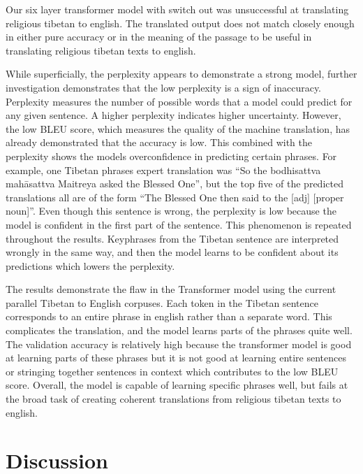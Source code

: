 \documentclass[letterpaper, 12 pt, conference]{ieeeconf}  %
\begin{document}
\par
Our six layer transformer model with switch out was unsuccessful at translating religious tibetan to english. The translated output does not match closely enough in either pure accuracy or in the meaning of the passage to be useful in translating religious tibetan texts to english. \par
While superficially, the perplexity appears to demonstrate a strong model, further investigation demonstrates that the low perplexity is a sign of inaccuracy. Perplexity measures the number of possible words that a model could predict for any given sentence. A higher perplexity indicates higher uncertainty. However, the low BLEU score, which measures the quality of the machine translation, has already demonstrated that the accuracy is low. This combined with the perplexity shows the models overconfidence in predicting certain phrases. For example, one Tibetan phrases expert translation was “So the bodhisattva mahāsattva Maitreya asked the Blessed One”, but the top five of the predicted translations all are of the form “The Blessed One then said to the [adj] [proper noun]”. Even though this sentence is wrong, the perplexity is low because the model is confident in the first part of the sentence. This phenomenon is repeated throughout the results. Keyphrases from the Tibetan sentence are interpreted wrongly in the same way, and then the model learns to be confident about its predictions which lowers the perplexity. \par
The results demonstrate the flaw in the Transformer model using the current parallel Tibetan to English corpuses. Each token in the Tibetan sentence corresponds to an entire phrase in english rather than a separate word. This complicates the translation, and the model learns parts of the phrases quite well. The validation accuracy is relatively high because the transformer model is good at learning parts of these phrases but it is not good at learning entire sentences or stringing together sentences in context which contributes to the low BLEU score. Overall, the model is capable of learning specific phrases well, but fails at the broad task of creating coherent translations from religious tibetan texts to english. 


\section{Discussion}
\end{document}
